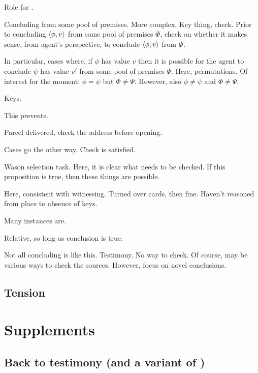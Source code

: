 \begin{note}
  Role for .

  Concluding from some pool of premises.
  More complex.
  Key thing, check.
  Prior to concluding \(\langle \phi, v \rangle\) from some pool of premises \(\Phi\), check on whether it makes sense, from agent's perspective, to conclude \(\langle \phi, v \rangle\) from \(\Phi\).

  In particular, cases where, if \(\phi\) has value \(v\) then it is possible for the agent to conclude \(\psi\) has value \(v'\) from some pool of premises \(\Psi\).
  Here, permutations.
  Of interest for the moment:
  \(\phi = \psi\) but \(\Phi \ne \Psi\).
  However, also \(\phi \ne \psi\) and \(\Phi \ne \Psi\).

  Keys.

  This prevents.

  Parcel delivered, check the address before opening.

  Cases go the other way.
  Check is satisfied.

  Wason selection task.
  Here, it is clear what needs to be checked.
  If this proposition is true, then these things are possible.

  Here, consistent with witnessing.
  Turned over cards, then fine.
  Haven't reasoned from place to absence of keys.

  Many instances are.

  Relative, so long as conclusion is true.
\end{note}

\begin{note}
  Not all concluding is like this.
  Testimony.
  No way to check.
  Of course, may be various ways to check the sources.
  However, focus on novel conclusions.
\end{note}




\subsection{Tension}
\label{sec:tension-1}

\section{Supplements}
\label{sec:overview:supplements}

\subsection{Back to testimony (and a variant of \zS{})}

